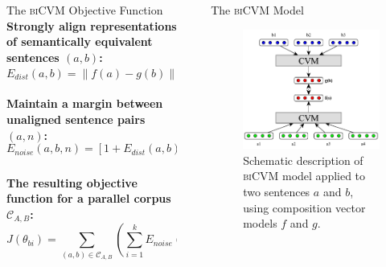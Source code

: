 \documentclass[final]{beamer}
\newlength{\sepwid}
\newlength{\onecolwid}
\newcommand{\biCVM}{\textsc{biCVM}\xspace}
\begin{document}
\begin{frame}[t]
\begin{columns}[t]
\begin{column}{\onecolwid}
      \begin{block}{The \biCVM Objective Function}
        \textbf{Strongly align representations of semantically equivalent
          sentences $(a,b)$:}
        \begin{equation}
          E_{dist}(a,b) = \left\| f(a) - g(b) \right\|^2\label{eqn:bi-error}
        \end{equation}
        ~\\
        \textbf{Maintain a margin between unaligned sentence pairs $(a,n)$:}
        \begin{equation}
          E_{noise}(a,b,n) = \left[1 + E_{dist}(a,b) - E_{dist}(a,n)\right]_{+}
        \end{equation}
        ~\\
        \textbf{The resulting objective function for a parallel corpus
          $\mathcal{C}_{A,B}$:}
        \begin{equation}
          J(\theta_{bi})=\sum_{(a,b) \in \mathcal{C}_{A,B}} \left( \sum_{i=1}^{k}
            E_{noise}(a,b,n_i)\right) + \frac{\lambda}{2}\|\theta_{bi}\|^2
        \end{equation}
      \end{block}
    \end{column} %

  \begin{column}{\sepwid}\end{column} %

    \begin{column}{\onecolwid} %
      \begin{block}{The \biCVM Model}
        \begin{figure}
          \includegraphics[scale=2.7]{fig3.pdf}
          \caption{Schematic description of \biCVM model applied to two
            sentences $a$ and $b$, using composition vector models $f$ and $g$.}
          \label{fig:ccgrae}
        \end{figure}
      \end{block}


\end{column}
\end{columns}
\end{frame}
\end{document}
